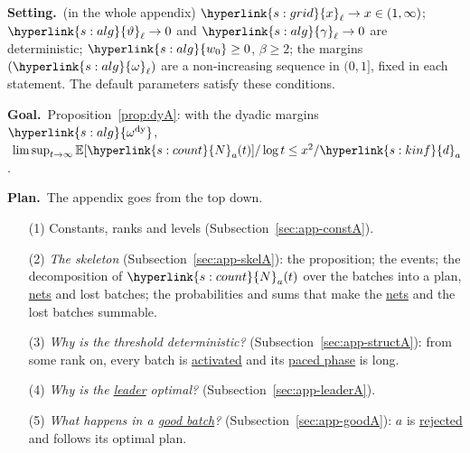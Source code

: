\documentclass[10pt]{article}
\newcommand{\sy}[2]{{\hyperlink{#1}{#2}}}
\newcommand{\E}{\mathbb{E}}
\newcommand{\1}{\mathbf{1}}
\newcommand{\da}{\sy{s:kinf}{d}_a}
\newcommand{\Ng}{\sy{s:count}{N}}
\newcommand{\xg}{\sy{s:grid}{x}}
\newcommand{\wz}{\sy{s:alg}{w_0}}
\newcommand{\om}{\sy{s:alg}{\omega}}
\newcommand{\ody}{\sy{s:alg}{\omega^{\mathrm{dy}}}}
\newcommand{\thv}{\sy{s:alg}{\vartheta}}
\newcommand{\gam}{\sy{s:alg}{\gamma}}
\newcommand{\Setting}{\noindent\textbf{Setting.}\ }
\newcommand{\Goal}{\par\smallskip\noindent\textbf{Goal.}\ }
\newcommand{\Plan}{\par\smallskip\noindent\textbf{Plan.}\ }
\newcommand{\term}[2]{\hyperlink{#1}{#2}}
\begin{document}
\begin{setgoal}
\Setting (in the whole appendix) $\xg_\ell\to x\in(1,\infty)$; $\thv_\ell\to0$ and $\gam_\ell\to0$ are deterministic; $\wz\ge0$, $\beta\ge2$; the margins $(\om_\ell)$
are a non-increasing sequence in $(0,1]$, fixed in each statement. The default parameters satisfy these conditions.
\Goal Proposition~\ref{prop:dyA}: with the dyadic margins $\ody$, $\ \limsup_{t\to\infty}\E[\Ng_a(t)]/\log t\le x^2/\da$.
\Plan The appendix goes from the top down.
\begin{enumerate}
\item[(1)] Constants, ranks and levels (Subsection~\ref{sec:app-constA}).
\item[(2)] \emph{The skeleton} (Subsection~\ref{sec:app-skelA}): the proposition; the events; the decomposition of $\Ng_a(t)$ over the batches into a plan, \term{t:net}{nets} and
lost batches; the probabilities and sums that make the \term{t:net}{nets} and the lost batches summable.
\item[(3)] \emph{Why is the threshold deterministic?} (Subsection~\ref{sec:app-structA}): from some rank on, every batch is \term{s:act}{activated} and its \term{s:act}{paced phase} is long.
\item[(4)] \emph{Why is the \term{t:leader}{leader} optimal?} (Subsection~\ref{sec:app-leaderA}).
\item[(5)] \emph{What happens in a \term{s:evA}{good batch}?} (Subsection~\ref{sec:app-goodA}): $a$ is \term{t:verdict}{rejected} and follows its optimal plan.
\end{enumerate}
\end{setgoal}
\end{document}
